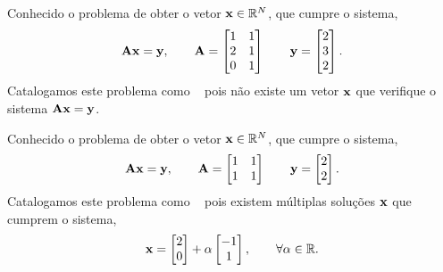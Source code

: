 \begin{example}
Conhecido o problema de obter o vetor $\VECTOR{x}\in \mathbb{R}^N$,
que cumpre o sistema,
\begin{equation}
\MATRIX{A}\VECTOR{x}=\VECTOR{y},
\qquad
\MATRIX{A}=
\begin{bmatrix}
1 & 1\\
2 & 1\\
0 & 1
\end{bmatrix}
\qquad
\VECTOR{y}=
\begin{bmatrix}
2\\
3\\
2
\end{bmatrix}.
\end{equation}
Catalogamos este problema como \illposed~ pois não existe um vetor $\VECTOR{x}$
que verifique o sistema $\MATRIX{A}\VECTOR{x}=\VECTOR{y}$.
\end{example}


\begin{example}
Conhecido o problema de obter o vetor $\VECTOR{x}\in \mathbb{R}^N$,
que cumpre o sistema,
\begin{equation}
\MATRIX{A}\VECTOR{x}=\VECTOR{y},
\qquad
\MATRIX{A}=
\begin{bmatrix}
1 & 1\\
1 & 1
\end{bmatrix}
\qquad
\VECTOR{y}=
\begin{bmatrix}
2\\
2
\end{bmatrix}.
\end{equation}
Catalogamos este problema como \illposed~  pois existem múltiplas soluções $\VECTOR{x}$
que cumprem o sistema,
\begin{equation}
\VECTOR{x}=
\begin{bmatrix}
2\\
0
\end{bmatrix}
+\alpha
\begin{bmatrix}
-1\\
1
\end{bmatrix},
\qquad
\forall \alpha \in \mathbb{R}.
\end{equation}

\end{example}
